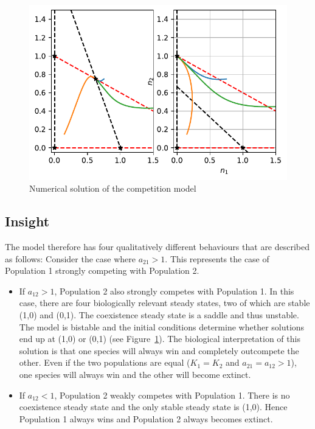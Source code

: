 \documentclass[
  letterpaper,
  DIV=11,
  numbers=noendperiod]{scrreprt}
\providecommand{\tightlist}{%
  \setlength{\itemsep}{0pt}\setlength{\parskip}{0pt}}\usepackage{longtable,booktabs,array}
\begin{document}
\begin{figure}

{\centering \includegraphics{ContinuousTimeTwoSepcies_files/figure-pdf/fig-comp-numsol-phplane-output-1.pdf}

}

\caption{\label{fig-comp-numsol-phplane}Numerical solution of the
competition model}

\end{figure}

\hypertarget{insight}{%
\subsection{Insight}\label{insight}}

The model therefore has four qualitatively different behaviours that are
described as follows: Consider the case where \(a_{21}>1\). This
represents the case of Population 1 strongly competing with Population
2.

\begin{itemize}
\tightlist
\item
  If \(a_{12}>1\), Population 2 also strongly competes with Population
  1. In this case, there are four biologically relevant steady states,
  two of which are stable (1,0) and (0,1). The coexistence steady state
  is a saddle and thus unstable. The model is bistable and the initial
  conditions determine whether solutions end up at (1,0) or (0,1) (see
  Figure~\ref{fig-comp-numsol-phplane}). The biological interpretation
  of this solution is that one species will always win and completely
  outcompete the other. Even if the two populations are equal
  (\(K_1=K_2\) and \(a_{21}=a_{12}>1\)), one species will always win and
  the other will become extinct.
\item
  If \(a_{12}<1\), Population 2 weakly competes with Population 1. There
  is no coexistence steady state and the only stable steady state is
  (1,0). Hence Population 1 always wins and Population 2 always becomes
  extinct.
\end{itemize}
\end{document}
